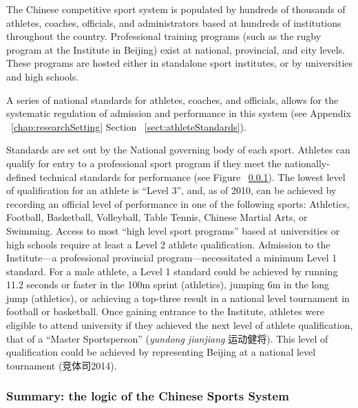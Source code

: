 \begin{CJK}{UTF8}{gbsn}
The Chinese competitive sport system is populated by hundreds of thousands of athletes, coaches, officials, and administrators based at hundreds of institutions throughout the country.  Professional training programs (such as the rugby program at the Institute in Beijing) exist at national, provincial, and city levels.  These programs are hosted either in standalone sport institutes, or by universities and high schools.

A series of national standards for athletes, coaches, and officials, allows for the systematic regulation of admission and performance in this system (see Appendix ~\ref{chap:researchSetting} Section ~\ref{sect:athleteStandards}).


 Standards are set out by the National governing body of each sport.  Athletes can qualify for entry to a professional sport program if they meet the nationally-defined technical standards for performance (see Figure ~\ref{}).  The lowest level of qualification for an athlete is ``Level 3'', and, as of 2010, can be achieved by recording an official level of performance in one of the following sports: Athletics, Football, Basketball, Volleyball, Table Tennis, Chinese Martial Arts, or Swimming.  Access to most ``high level sport programs'' based at universities or high schools require at least a Level 2 athlete qualification.  Admission to the Institute---a professional provincial program---necessitated a minimum Level 1 standard.  For a male athlete, a Level 1 standard could be achieved by running 11.2 seconds or faster in the 100m sprint (athletics), jumping 6m in the long jump (athletics), or achieving a top-three result in a national level tournament in football or basketball.  Once gaining entrance to the Institute, athletes were eligible to attend university if they achieved the next level of athlete qualification, that of a ``Master Sportsperson'' (\textit{yundong jianjiang} 运动健将).  This level of qualification could be achieved by representing Beijing at a national level tournament (竞体司2014).






\subsubsection{Summary: the logic of the Chinese Sports System}


\end{CJK}
